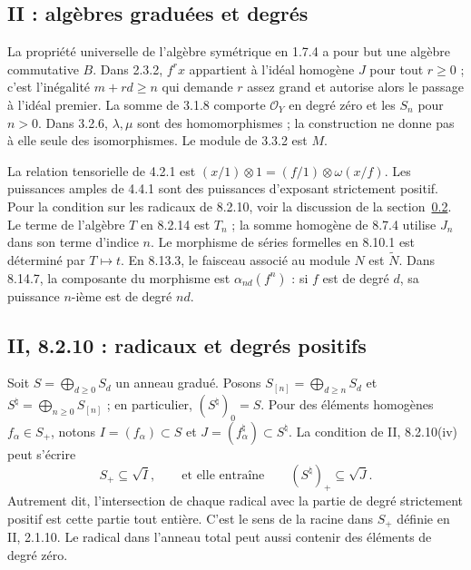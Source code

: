 \subsection{II : algèbres graduées et degrés}
\label{note:base2-graded}
La propriété universelle de l'algèbre symétrique en 1.7.4 a pour
but une algèbre commutative $B$. Dans 2.3.2, $f^rx$ appartient
à l'idéal homogène $J$ pour tout $r\geq0$ ; c'est l'inégalité
$m+rd\geq n$ qui demande $r$ assez grand et autorise alors
le passage à l'idéal premier. La somme de 3.1.8 comporte
$\mathcal O_Y$ en degré zéro et les $S_n$ pour $n>0$.
Dans 3.2.6, $\lambda,\mu$ sont des homomorphismes ; la construction
ne donne pas à elle seule des isomorphismes. Le module de 3.3.2
est $M$.

La relation tensorielle de 4.2.1 est
$(x/1)\otimes1=(f/1)\otimes\omega(x/f)$.
Les puissances amples de 4.4.1 sont des puissances d'exposant
strictement positif. Pour la condition sur les radicaux de 8.2.10, voir la
discussion de la section~\ref{note:base2-positive-radical}.
Le terme de l'algèbre $T$ en 8.2.14 est $T_n$ ; la somme homogène
de 8.7.4 utilise $J_n$ dans son terme d'indice $n$.
Le morphisme de séries formelles en 8.10.1 est déterminé par
$T\mapsto t$.
En 8.13.3, le faisceau associé au module $N$ est $\widetilde N$.
Dans 8.14.7, la composante du morphisme est
$\alpha_{nd}(f^n)$ : si $f$ est de degré $d$, sa puissance
$n$-ième est de degré $nd$.

\subsection{II, 8.2.10 : radicaux et degrés positifs}
\label{note:base2-positive-radical}

Soit $S=\bigoplus_{d\geq0}S_d$ un anneau gradué. Posons
$S_{[n]}=\bigoplus_{d\geq n}S_d$ et
$S^\natural=\bigoplus_{n\geq0}S_{[n]}$ ; en particulier,
$(S^\natural)_0=S$. Pour des éléments homogènes
$f_\alpha\in S_+$, notons $I=(f_\alpha)\subset S$ et
$J=(f_\alpha^\natural)\subset S^\natural$.
La condition de II, 8.2.10(iv) peut s'écrire
\[
 S_+\subseteq\sqrt I,
 \qquad\text{et elle entraîne}\qquad
 (S^\natural)_+\subseteq\sqrt J.
\]
Autrement dit, l'intersection de chaque radical avec la partie
de degré strictement positif est cette partie tout entière.
C'est le sens de la racine dans $S_+$ définie en II, 2.1.10.
Le radical dans l'anneau total peut aussi contenir des éléments
de degré zéro.

